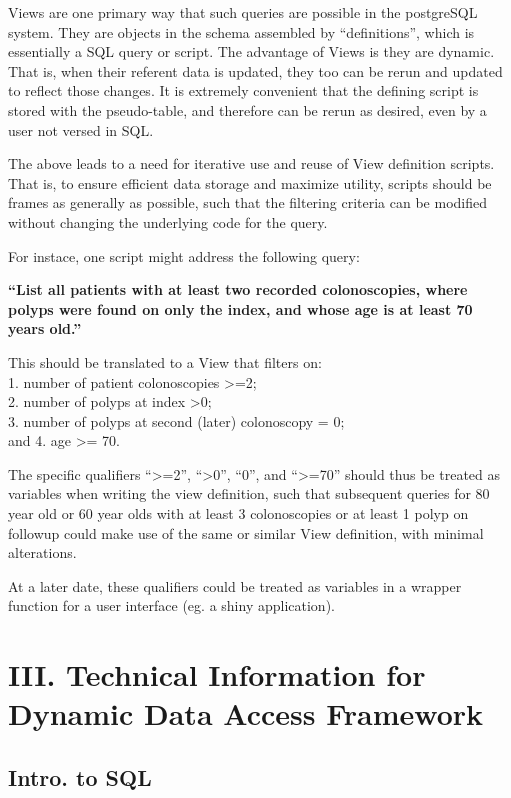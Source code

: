 \documentclass[]{article}
\begin{document}
Views are one primary way that such queries are possible in the
postgreSQL system. They are objects in the schema assembled by
``definitions'', which is essentially a SQL query or script. The
advantage of Views is they are dynamic. That is, when their referent
data is updated, they too can be rerun and updated to reflect those
changes. It is extremely convenient that the defining script is stored
with the pseudo-table, and therefore can be rerun as desired, even by a
user not versed in SQL.

The above leads to a need for iterative use and reuse of View definition
scripts. That is, to ensure efficient data storage and maximize utility,
scripts should be frames as generally as possible, such that the
filtering criteria can be modified without changing the underlying code
for the query.

For instace, one script might address the following query:

\textbf{``List all patients with at least two recorded colonoscopies,
where polyps were found on only the index, and whose age is at least 70
years old.''}

This should be translated to a View that filters on:\\
1. number of patient colonoscopies \textgreater{}=2;\\
2. number of polyps at index \textgreater{}0;\\
3. number of polyps at second (later) colonoscopy = 0;\\
and 4. age \textgreater{}= 70.

The specific qualifiers ``\textgreater{}=2'', ``\textgreater{}0'',
``0'', and ``\textgreater{}=70'' should thus be treated as variables
when writing the view definition, such that subsequent queries for 80
year old or 60 year olds with at least 3 colonoscopies or at least 1
polyp on followup could make use of the same or similar View definition,
with minimal alterations.

At a later date, these qualifiers could be treated as variables in a
wrapper function for a user interface (eg. a shiny application).

\section{III. Technical Information for Dynamic Data Access
Framework}\label{iii.-technical-information-for-dynamic-data-access-framework}

\subsection{Intro. to SQL}\label{intro.-to-sql}
\end{document}
